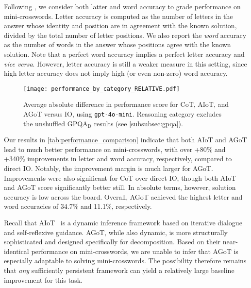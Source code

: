 \documentclass{article}
\begin{document}
Following \citet{yao2024tree}, we consider both latter and word accuracy to grade performance on mini-crosswords. Letter accuracy is computed as the number of letters in the answer whose identity and position are in agreement with the known solution, divided by the total number of letter positions. We also report the \textit{word} accuracy as the number of words in the answer whose positions agree with the known solution. Note that a perfect word accuracy implies a perfect letter accuracy and \textit{vice versa}. However, letter accuracy is still a weaker measure in this setting, since high letter accuracy does not imply high (or even non-zero) word accuracy.

\begin{figure}[t]
    \centering
    \texttt{[image: performance\_by\_category\_RELATIVE.pdf]}
    \caption{Average absolute difference in performance score for CoT, AIoT, and AGoT versus IO, using \texttt{gpt-4o-mini}. Reasoning category excludes the unshuffled GPQA$_\text{D}$ results (see \autoref{subsubsec:gpqa}).}
    \label{fig:performance comparison}
\end{figure}

Our results in \autoref{tab:performance_comparison} indicate that both AIoT and AGoT lead to much better performance on mini-crosswords, with over +80\% and +340\% improvements in letter and word accuracy, respectively, compared to direct IO. Notably, the improvement margin is much larger for AGoT. Improvements were also significant for CoT over direct IO, though both AIoT and AGoT score significantly better still. In absolute terms, however, solution accuracy is low across the board. Overall, AGoT achieved the highest letter and word accuracies of 34.7\% and 11.1\%, respectively.

Recall that AIoT~\citep{radha2024iterationthoughtleveraginginner} is a dynamic inference framework based on iterative dialogue and self-reflexive guidance. AGoT, while also dynamic, is more structurally sophisticated and designed specifically for decomposition. Based on their near-identical performance on mini-crosswords, we are unable to infer that AGoT is especially adaptable to solving mini-crosswords. The possibility therefore remains that \textit{any} sufficiently persistent framework can yield a relatively large baseline improvement for this task.
\end{document}
